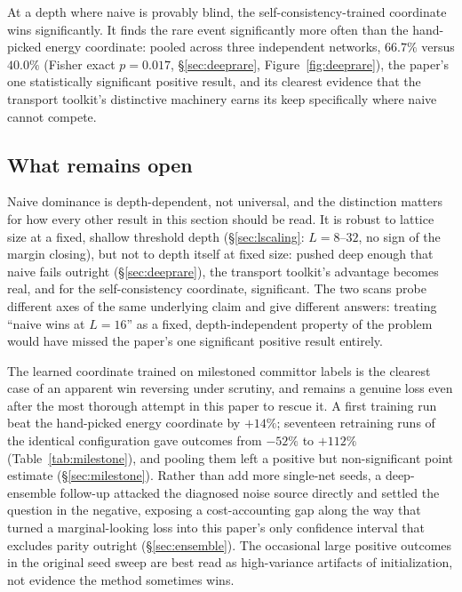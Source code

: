 \documentclass[a4paper,fleqn]{cas-sc}
\let\Oldsubsection\subsection
\renewcommand{\subsection}{\FloatBarrier\Oldsubsection}
\begin{document}
At a depth where naive is provably blind, the self-consistency-trained
	coordinate wins significantly. It finds the rare event
significantly more often than the hand-picked energy coordinate: pooled across three
independent networks, $66.7\%$ versus $40.0\%$ (Fisher exact $p=0.017$,
\S\ref{sec:deeprare}, Figure~\ref{fig:deeprare}), the paper's one statistically
significant positive result, and
its clearest evidence that the transport toolkit's distinctive machinery earns its keep
specifically where naive cannot compete.

\subsection{What remains open}
Naive dominance is depth-dependent, not universal, and the distinction matters for
	how every other result in this section should be read. It is robust to lattice size at a
fixed, shallow threshold depth (\S\ref{sec:lscaling}: $L=8$--$32$, no sign of the margin
closing), but not to depth itself at fixed size: pushed deep enough that naive fails
outright (\S\ref{sec:deeprare}), the transport toolkit's advantage becomes real, and for the
self-consistency coordinate, significant. The two scans probe different axes of the same
underlying claim and give different answers: treating ``naive wins at $L=16$'' as a fixed,
depth-independent property of the problem would have missed the paper's one significant
positive result entirely.

The learned coordinate trained on milestoned committor labels is the clearest case
	of an apparent win reversing under scrutiny, and remains a genuine loss even after the
most thorough attempt in this paper to rescue it. A first training run beat the hand-picked
energy coordinate by $+14\%$; seventeen retraining runs of the identical configuration gave
outcomes from $-52\%$ to $+112\%$ (Table~\ref{tab:milestone}), and pooling them left a
positive but non-significant
point estimate (\S\ref{sec:milestone}). Rather than add more single-net seeds, a
deep-ensemble follow-up attacked the diagnosed noise source directly and settled the
question in the negative, exposing a cost-accounting gap along the way that turned a
marginal-looking loss into this paper's only confidence interval that excludes parity
outright (\S\ref{sec:ensemble}). The occasional large positive outcomes in the original
seed sweep are best read as high-variance artifacts of initialization, not evidence the
method sometimes wins.
\end{document}
